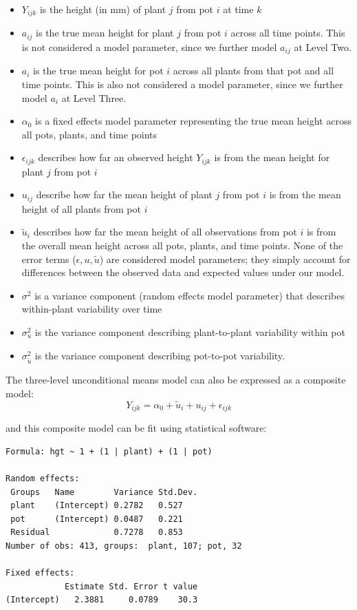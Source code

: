 \documentclass[
]{krantz}
\providecommand{\tightlist}{%
  \setlength{\itemsep}{0pt}\setlength{\parskip}{0pt}}
\begin{document}
\begin{itemize}
\tightlist
\item
  \(Y_{ijk}\) is the height (in mm) of plant \(j\) from pot \(i\) at time \(k\)
\item
  \(a_{ij}\) is the true mean height for plant \(j\) from pot \(i\) across all time points. This is not considered a model parameter, since we further model \(a_{ij}\) at Level Two.
\item
  \(a_{i}\) is the true mean height for pot \(i\) across all plants from that pot and all time points. This is also not considered a model parameter, since we further model \(a_{i}\) at Level Three.
\item
  \(\alpha_{0}\) is a fixed effects model parameter representing the true mean height across all pots, plants, and time points
\item
  \(\epsilon_{ijk}\) describes how far an observed height \(Y_{ijk}\) is from the mean height for plant \(j\) from pot \(i\)
\item
  \(u_{ij}\) describe how far the mean height of plant \(j\) from pot \(i\) is from the mean height of all plants from pot \(i\)
\item
  \(\tilde{u}_{i}\) describes how far the mean height of all observations from pot \(i\) is from the overall mean height across all pots, plants, and time points. None of the error terms (\(\epsilon, u, \tilde{u}\)) are considered model parameters; they simply account for differences between the observed data and expected values under our model.
\item
  \(\sigma^2\) is a variance component (random effects model parameter) that describes within-plant variability over time
\item
  \(\sigma_{u}^{2}\) is the variance component describing plant-to-plant variability within pot
\item
  \(\sigma_{\tilde{u}}^{2}\) is the variance component describing pot-to-pot variability.
\end{itemize}

The three-level unconditional means model can also be expressed as a composite model:
\begin{equation}
Y_{ijk}=\alpha_{0}+\tilde{u}_{i}+u_{ij}+\epsilon_{ijk}
\label{eq:initununcomp}
\end{equation}

and this composite model can be fit using statistical software:

\begin{verbatim}
Formula: hgt ~ 1 + (1 | plant) + (1 | pot)

Random effects:
 Groups   Name        Variance Std.Dev.
 plant    (Intercept) 0.2782   0.527   
 pot      (Intercept) 0.0487   0.221   
 Residual             0.7278   0.853   
Number of obs: 413, groups:  plant, 107; pot, 32

Fixed effects:
            Estimate Std. Error t value
(Intercept)   2.3881     0.0789    30.3
\end{verbatim}
\end{document}
